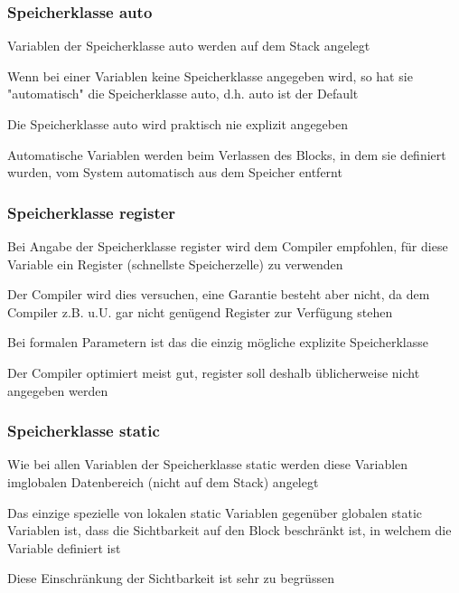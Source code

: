 				\subsubsection{Speicherklasse auto}
					\begin{compactitem}
						\item Variablen der Speicherklasse auto werden auf dem Stack angelegt
						\item Wenn bei einer Variablen keine Speicherklasse angegeben wird, so hat sie
						"automatisch" die Speicherklasse auto, d.h. auto ist der Default
						\item Die Speicherklasse auto wird praktisch nie explizit angegeben 
						\item Automatische Variablen werden beim Verlassen des Blocks, in dem sie
						definiert wurden, vom System automatisch aus dem Speicher entfernt
					\end{compactitem}
				\subsubsection{Speicherklasse register}
					\begin{compactitem}
						\item Bei Angabe der Speicherklasse register wird dem Compiler empfohlen, für
						diese Variable ein Register (schnellste Speicherzelle) zu verwenden
						\item Der Compiler wird dies versuchen, eine Garantie besteht aber nicht, da dem
						Compiler z.B. u.U. gar nicht genügend Register zur Verfügung stehen
						\item Bei formalen Parametern ist das die einzig mögliche explizite Speicherklasse
						\item Der Compiler optimiert meist gut, register soll deshalb üblicherweise nicht
						angegeben werden
					\end{compactitem}				
				\subsubsection{Speicherklasse static}
					\begin{compactitem}
						\item Wie bei allen Variablen der Speicherklasse static werden diese Variablen imglobalen Datenbereich (nicht auf dem Stack) angelegt
						\item Das einzige spezielle von lokalen static Variablen gegenüber globalen 
						static Variablen ist, dass die Sichtbarkeit auf den Block beschränkt ist, in
						welchem die Variable definiert ist
						\item Diese Einschränkung der Sichtbarkeit ist sehr zu begrüssen
					\end{compactitem}	
